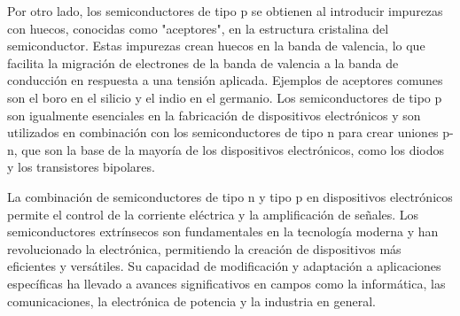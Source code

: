 \documentclass[10.5pt]{article}
\begin{document}
    Por otro lado, los semiconductores de tipo p se obtienen al introducir impurezas con huecos, conocidas como "aceptores", en la estructura cristalina del semiconductor. Estas impurezas crean huecos en la banda de valencia, lo que facilita la migración de electrones de la banda de valencia a la banda de conducción en respuesta a una tensión aplicada. Ejemplos de aceptores comunes son el boro en el silicio y el indio en el germanio. Los semiconductores de tipo p son igualmente esenciales en la fabricación de dispositivos electrónicos y son utilizados en combinación con los semiconductores de tipo n para crear uniones p-n, que son la base de la mayoría de los dispositivos electrónicos, como los diodos y los transistores bipolares.

    La combinación de semiconductores de tipo n y tipo p en dispositivos electrónicos permite el control de la corriente eléctrica y la amplificación de señales. Los semiconductores extrínsecos son fundamentales en la tecnología moderna y han revolucionado la electrónica, permitiendo la creación de dispositivos más eficientes y versátiles. Su capacidad de modificación y adaptación a aplicaciones específicas ha llevado a avances significativos en campos como la informática, las comunicaciones, la electrónica de potencia y la industria en general.
\end{document}
